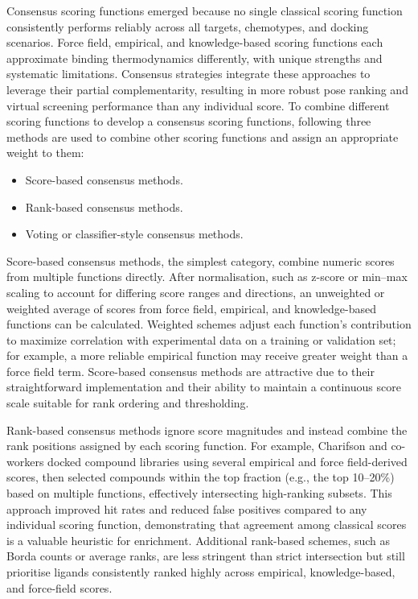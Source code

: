 \documentclass[12pt]{article}
\begin{document}
Consensus scoring functions emerged because no single classical scoring function consistently performs reliably across all targets, chemotypes, and docking scenarios. Force field, empirical, and knowledge-based scoring functions each approximate binding thermodynamics differently, with unique strengths and systematic limitations. Consensus strategies integrate these approaches to leverage their partial complementarity, resulting in more robust pose ranking and virtual screening performance than any individual score\cite{CH3_Wang2017,CH3_nhat2023}. To combine different scoring functions to develop a consensus scoring functions, following three methods are used to combine other scoring functions and assign an appropriate weight to them:

\begin{itemize}
    \item Score-based consensus methods.
    \item Rank-based consensus methods.
    \item Voting or classifier-style consensus methods.
\end{itemize}   
Score-based consensus methods\cite{CH3_yang2005}, the simplest category, combine numeric scores from multiple functions directly. After normalisation, such as z-score or min–max scaling to account for differing score ranges and directions, an unweighted or weighted average of scores from force field, empirical, and knowledge-based functions can be calculated. Weighted schemes adjust each function's contribution to maximize correlation with experimental data on a training or validation set; for example, a more reliable empirical function may receive greater weight than a force field term. Score-based consensus methods are attractive due to their straightforward implementation and their ability to maintain a continuous score scale suitable for rank ordering and thresholding.

Rank-based consensus methods ignore score magnitudes and instead combine the rank positions assigned by each scoring function. For example, Charifson and co-workers\cite{CH3_charifson1999} docked compound libraries using several empirical and force field-derived scores, then selected compounds within the top fraction (e.g., the top 10–20\%) based on multiple functions, effectively intersecting high-ranking subsets. This approach improved hit rates and reduced false positives compared to any individual scoring function, demonstrating that agreement among classical scores is a valuable heuristic for enrichment. Additional rank-based schemes, such as Borda counts or average ranks\cite{CH3_grillberger2026}, are less stringent than strict intersection but still prioritise ligands consistently ranked highly across empirical, knowledge-based, and force-field scores.
\end{document}
